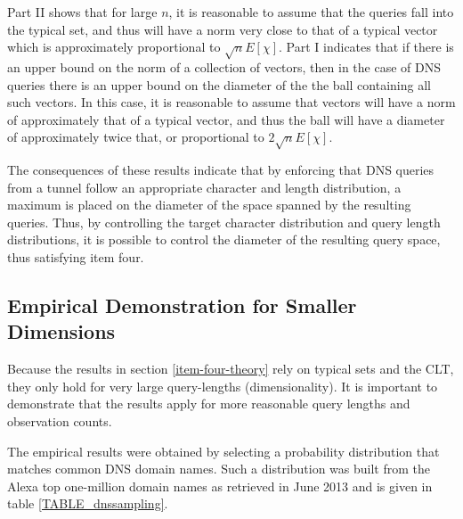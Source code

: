 \documentclass[12pt]{report}
\theoremstyle{remark}
\theoremstyle{definition}
\theoremstyle{definition}
\theoremstyle{definition}
\begin{document}
Part II shows that for large $n$, it is reasonable to assume that the queries
fall into the typical set, and thus will have a norm very close to that of a
typical vector which is approximately proportional to $\sqrt{n}E[\chi]$. Part I
indicates that if there is an upper bound on the norm of a collection of
vectors, then in the case of DNS queries there is an upper bound on the diameter
of the the ball containing all such vectors. In this case, it is reasonable to
assume that vectors will have a norm of approximately that of a typical vector,
and thus the ball will have a diameter of approximately twice that, or
proportional to $2\sqrt{n}E[\chi]$.

The consequences of these results indicate that by enforcing that DNS queries
from a tunnel follow an appropriate character and length distribution, a maximum
is placed on the diameter of the space spanned by the resulting queries. Thus,
by controlling the target character distribution and query length distributions,
it is possible to control the diameter of the resulting query space, thus
satisfying item four.

\subsection{Empirical Demonstration for Smaller Dimensions}
Because the results
in section \ref{item-four-theory} rely on typical sets and the CLT, they only
hold for very large query-lengths (dimensionality). It is important to
demonstrate that the results apply for more reasonable query lengths and
observation counts.

The empirical results were obtained by selecting a probability distribution that
matches common DNS domain names. Such a distribution was built from the Alexa
top one-million domain names as retrieved in June 2013 and is given in table
\ref{TABLE_dnssampling}.
\end{document}
